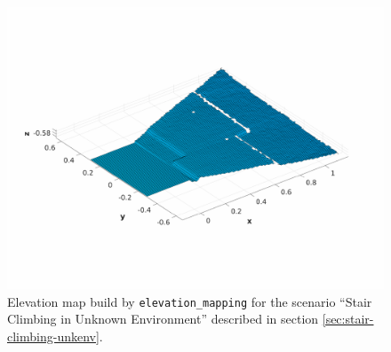 \begin{figure}
  \centering
  \includegraphics[width=\textwidth]{figures/onlymap-xtion-20cm.pdf}
  \caption{Elevation map build by \texttt{elevation\_mapping} for the scenario 
      ``Stair Climbing in Unknown Environment'' described in section 
      \ref{sec:stair-climbing-unkenv}.}
  \label{fig:onlymap-xtion-20cm}
\end{figure}

